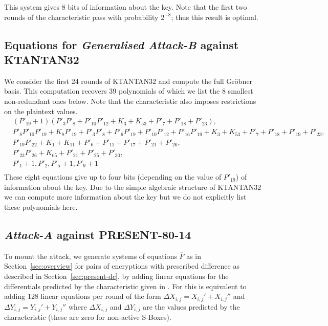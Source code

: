 This system gives 8 bits of information about the key. Note that the first two rounds of the characteristic pass with
probability $2^{-8}$; thus this result is optimal.

\subsection{Equations for \emph{Generalised Attack-B} against KTANTAN32}
We consider the first 24 rounds of KTANTAN32 and compute the full Gröbner basis. This computation recovers 39 polynomials of which we list the 8 smallest non-redundant ones below. Note that the characteristic also imposes restrictions on the plaintext values.
\begin{align*}
& {(P'_{19} + 1)} {(P'_{3} P'_{8} + P'_{10} P'_{12} + K_{3} + K_{53} + P'_{7} + P'_{18} + P'_{23})} ,\\
& P'_{8} P'_{10} P'_{19} + K_{8} P'_{19} + P'_{3} P'_{8} + P'_{6} P'_{19} + P'_{10} P'_{12} + P'_{16} P'_{19} + K_{3} +
K_{53} + P'_{7} + P'_{18} + P'_{19} + P'_{23} ,\\
& P'_{19} P'_{22} + K_{1} + K_{11} + P'_{6} + P'_{11} + P'_{17} + P'_{21} + P'_{26} ,\\
& P'_{23} P'_{26} + K_{65} + P'_{21} + P'_{25} + P'_{30} ,\\
& P'_{1} + 1 , P'_{2} , P'_{5} + 1 , P'_{9} + 1\\
\end{align*}
These eight equations give up to four bits (depending on the value of $P'_{19}$) of information about the key. Due to the simple algebraic structure of KTANTAN32 we can compute more information about the key but we do not explicitly list these polynomials here.

\subsection{\emph{Attack-A} against PRESENT-80-14}
To mount the attack, we generate systems of equations $\overline{F}$ as in Section~\ref{sec:overview} for pairs of encryptions with prescribed difference as described in Section~\ref{sec:present-dc}, by adding linear equations for the differentials predicted by the characteristic given in \cite{present-dc:africacrypt}. For \PRESENT this is equivalent to adding 128 linear equations per round of the form $\Delta X_{i,j} = X_{i,j}' + X_{i,j}''$ and $\Delta Y_{i,j} = Y_{i,j}' + Y_{i,j}''$ where $\Delta X_{i,j}$ and $\Delta Y_{i,j}$ are the values predicted by the characteristic (these are zero for non-active S-Boxes).

